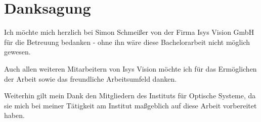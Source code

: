 \thispagestyle{plain}
\chapter*{Danksagung}
\label{ch:danksagung}

Ich möchte mich herzlich bei Simon Schmeißer von der Firma Isys Vision GmbH für die Betreuung bedanken - ohne ihn wäre diese Bachelorarbeit nicht möglich gewesen.

Auch allen weiteren Mitarbeitern von Isys Vision möchte ich für das Ermöglichen der Arbeit sowie das freundliche Arbeitsumfeld danken.

Weiterhin gilt mein Dank den Mitgliedern des Instituts für Optische Systeme, da sie mich bei meiner Tätigkeit am Institut maßgeblich auf diese Arbeit vorbereitet haben.